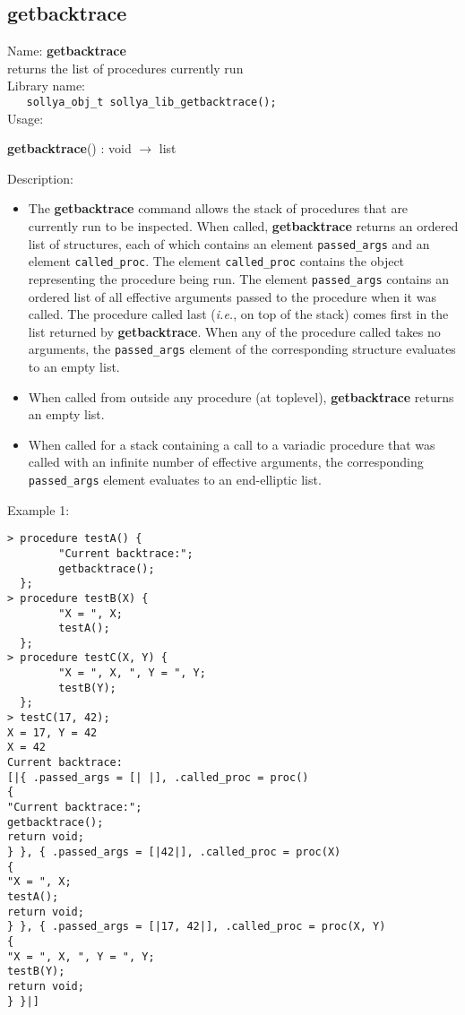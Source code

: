 \subsection{getbacktrace}
\label{labgetbacktrace}
\noindent Name: \textbf{getbacktrace}\\
\phantom{aaa}returns the list of \sollya procedures currently run\\[0.2cm]
\noindent Library name:\\
\verb|   sollya_obj_t sollya_lib_getbacktrace();|\\[0.2cm]
\noindent Usage: 
\begin{center}
\textbf{getbacktrace}() : \textsf{void} $\rightarrow$ \textsf{list}\\
\end{center}
\noindent Description: \begin{itemize}

\item The \textbf{getbacktrace} command allows the stack of \sollya procedures that are
   currently run to be inspected. When called, \textbf{getbacktrace} returns an
   ordered list of structures, each of which contains an element
   \verb|passed_args| and an element \verb|called_proc|. The element \verb|called_proc|
   contains the \sollya object representing the procedure being run. The
   element \verb|passed_args| contains an ordered list of all effective
   arguments passed to the procedure when it was called. The procedure called
   last (\emph{i.e.}, on top of the stack) comes first in the list returned
   by \textbf{getbacktrace}. When any of the procedure called takes no arguments, the
   \verb|passed_args| element of the corresponding structure evaluates to an empty
   list.

\item When called from outside any procedure (at toplevel), \textbf{getbacktrace} returns
   an empty list.

\item When called for a stack containing a call to a variadic procedure that was
   called with an infinite number of effective arguments, the corresponding
   \verb|passed_args| element evaluates to an end-elliptic list.
\end{itemize}
\noindent Example 1: 
\begin{center}\begin{minipage}{15cm}\begin{Verbatim}[frame=single,commandchars=\\\|\~]
> procedure testA() {
        "Current backtrace:";
        getbacktrace();
  };
> procedure testB(X) {
        "X = ", X;
        testA();
  };
> procedure testC(X, Y) {
        "X = ", X, ", Y = ", Y;
        testB(Y);
  };
> testC(17, 42);
X = 17, Y = 42
X = 42
Current backtrace:
[|{ .passed_args = [| |], .called_proc = proc()
{
"Current backtrace:";
getbacktrace();
return void;
} }, { .passed_args = [|42|], .called_proc = proc(X)
{
"X = ", X;
testA();
return void;
} }, { .passed_args = [|17, 42|], .called_proc = proc(X, Y)
{
"X = ", X, ", Y = ", Y;
testB(Y);
return void;
} }|]
\end{Verbatim}
\end{minipage}\end{center}
